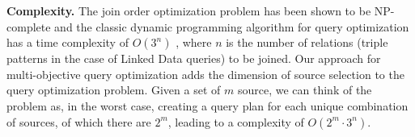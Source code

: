 \textbf{Complexity.} The join order optimization problem has been
shown to be NP-complete \cite{vance_rapid_1996} and the classic
dynamic programming algorithm for query optimization has a time
complexity of $O(3^n)$ \cite{kossmann_iterative_2000}, where $n$ is
the number of relations (triple patterns in the case of Linked Data
queries) to be joined. Our approach for multi-objective query
optimization adds the dimension of source selection to the query
optimization problem. Given a set of $m$ source, we can think of the
problem as, in the worst case, creating a query plan for each unique
combination of sources, of which there are $2^m$, leading to a
complexity of $O(2^m \cdot 3^n)$.












